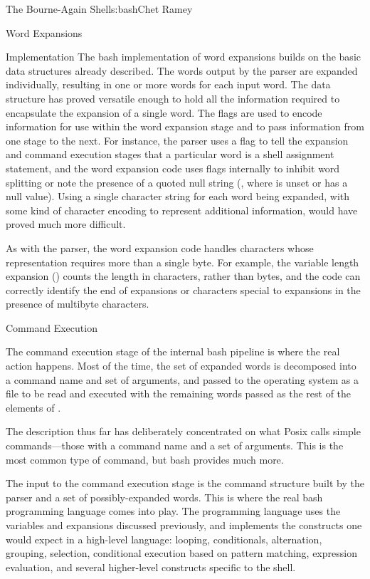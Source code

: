 \begin{aosachapter}{The Bourne-Again Shell}{s:bash}{Chet Ramey}
\begin{aosasect1}{Word Expansions}
\begin{aosasect2}{Implementation}
The bash implementation of word expansions builds on the basic data
structures already described.  The words output by the parser are
expanded individually, resulting in one or more words for each input
word.  The  data structure has proved versatile
enough to hold all the information required to encapsulate the
expansion of a single word. The flags are used to encode information
for use within the word expansion stage and to pass information from
one stage to the next. For instance, the parser uses a flag to tell
the expansion and command execution stages that a particular word is a
shell assignment statement, and the word expansion code uses flags
internally to inhibit word splitting or note the presence of a quoted
null string (, where  is unset or has a null
value).  Using a single character string for each word being expanded,
with some kind of character encoding to represent additional
information, would have proved much more difficult.

As with the parser, the word expansion code handles characters whose
representation requires more than a single byte.  For example, the
variable length expansion () counts the length in
characters, rather than bytes, and the code can correctly identify the
end of expansions or characters special to expansions in the presence
of multibyte characters.

\end{aosasect2}

\end{aosasect1}

\begin{aosasect1}{Command Execution}

The command execution stage of the internal bash pipeline is where the
real action happens.  Most of the time, the set of expanded words is
decomposed into a command name and set of arguments, and passed to the
operating system as a file to be read and executed with the remaining
words passed as the rest of the elements of .

The description thus far has deliberately concentrated on what Posix
calls simple commands---those with a command name and a set of
arguments.  This is the most common type of command, but bash provides
much more.

The input to the command execution stage is the command structure
built by the parser and a set of possibly-expanded words.  This is
where the real bash programming language comes into play.  The
programming language uses the variables and expansions discussed
previously, and implements the constructs one would expect in a
high-level language: looping, conditionals, alternation, grouping,
selection, conditional execution based on pattern matching, expression
evaluation, and several higher-level constructs specific to the shell.


\end{aosasect1}
\end{aosachapter}
